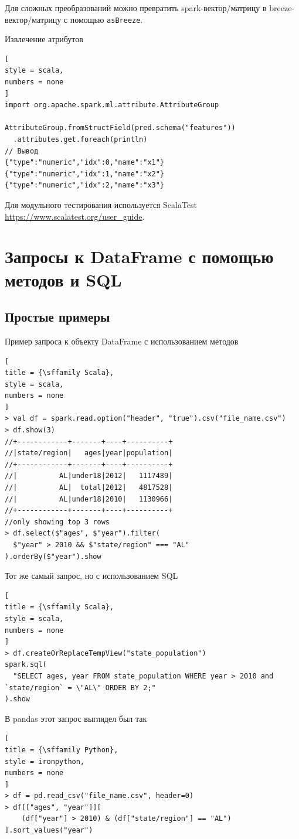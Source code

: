 \documentclass[%
	11pt,
	a4paper,
	utf8,
		]{article}
\begin{document}
Для сложных преобразований можно превратить spark-вектор/матрицу в breeze-вектор/матрицу с помощью \texttt{asBreeze}.

Извлечение атрибутов
\begin{lstlisting}[
style = scala,
numbers = none	
]
import org.apache.spark.ml.attribute.AttributeGroup

AttributeGroup.fromStructField(pred.schema("features"))
  .attributes.get.foreach(println)
// Вывод
{"type":"numeric","idx":0,"name":"x1"}
{"type":"numeric","idx":1,"name":"x2"}
{"type":"numeric","idx":2,"name":"x3"}
\end{lstlisting}

Для модульного тестирования используется ScalaTest \url{https://www.scalatest.org/user_guide}.


\section{Запросы к DataFrame с помощью методов и SQL}

\subsection{Простые примеры}

Пример запроса к объекту DataFrame с использованием методов
\begin{lstlisting}[
title = {\sffamily Scala},
style = scala,
numbers = none	
]
> val df = spark.read.option("header", "true").csv("file_name.csv")
> df.show(3)
//+------------+-------+----+----------+
//|state/region|   ages|year|population|
//+------------+-------+----+----------+
//|          AL|under18|2012|   1117489|
//|          AL|  total|2012|   4817528|
//|          AL|under18|2010|   1130966|
//+------------+-------+----+----------+
//only showing top 3 rows
> df.select($"ages", $"year").filter(
  $"year" > 2010 && $"state/region" === "AL"
).orderBy($"year").show
\end{lstlisting}

Тот же самый запрос, но с использованием SQL
\begin{lstlisting}[
title = {\sffamily Scala},
style = scala,
numbers = none	
]
> df.createOrReplaceTempView("state_population")
spark.sql(
  "SELECT ages, year FROM state_population WHERE year > 2010 and `state/region` = \"AL\" ORDER BY 2;"
).show
\end{lstlisting}

В pandas этот запрос выглядел был так

\begin{lstlisting}[
title = {\sffamily Python},
style = ironpython,
numbers = none	
]
> df = pd.read_csv("file_name.csv", header=0)
> df[["ages", "year"]][
    (df["year"] > 2010) & (df["state/region"] == "AL")
].sort_values("year")
\end{lstlisting}
\end{document}
